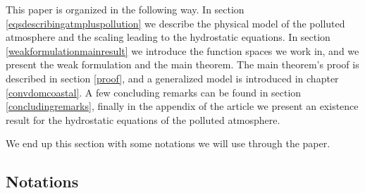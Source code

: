 \documentclass[11pt]{article}
\begin{document}
This paper is organized in the following way. In section \ref{eqsdescribingatmpluspollution} we describe the physical model of the polluted atmosphere and the scaling leading to the hydrostatic equations. In section \ref{weakformulationmainresult} we introduce the function spaces we work in, and we present the weak formulation and the main theorem. The main theorem's proof is described in section \ref{proof}, and a generalized model is introduced in chapter \ref{convdomcoastal}. A few concluding remarks can be found in section \ref{concludingremarks}, finally in the appendix of the article we present an existence result for the hydrostatic equations of the polluted atmosphere.

We end up this section with some notations we will use through the paper.

\subsection{Notations}
\end{document}
